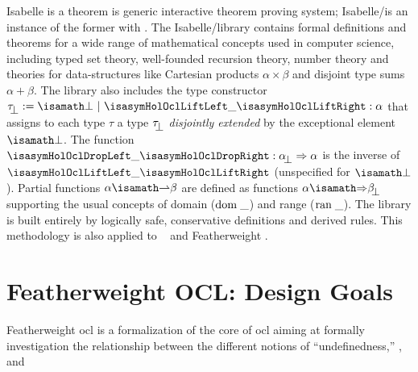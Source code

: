 Isabelle is a theorem is generic interactive theorem proving system;
Isabelle/\HOL is an instance of the former with \HOL.  The
Isabelle/\HOL library contains formal definitions and theorems for a
wide range of mathematical concepts used in computer science,
including typed set theory, well-founded recursion theory, number
theory and theories for data-structures like Cartesian products
$\alpha \times \beta$ and disjoint type sums $\alpha + \beta$.  The
library also includes the type constructor $\up{\tau} := \isasymbottom
~ | ~ \lift{\_} : \alpha$ that assigns to each type $\tau$ a type
$\up{\tau}$ \emph{disjointly extended} by the exceptional element
$\isasymbottom$. The function $\drop{\_}
: \up{\alpha} \to \alpha$ is the inverse of $\lift{\_}$ (unspecified
for $\isasymbottom$). Partial functions $\alpha \isasymrightharpoonup
\beta$ are defined as functions $\alpha \isasymRightarrow \up{\beta}$
supporting the usual concepts of domain ($\mathrm{dom}\;\_$) and range
($\mathrm{ran}\;\_$).  The library is built entirely by logically safe,
conservative definitions and derived rules.  This methodology is also
applied to \holocl~\cite{brucker.ea:hol-ocl:2008} and Featherweight
\OCL.



\section{Featherweight OCL: Design Goals}
Featherweight \acs{ocl} is a formalization of the core of \acs{ocl}
aiming at formally investigation the relationship between the
different notions of ``undefinedness,'' \ie,  and

